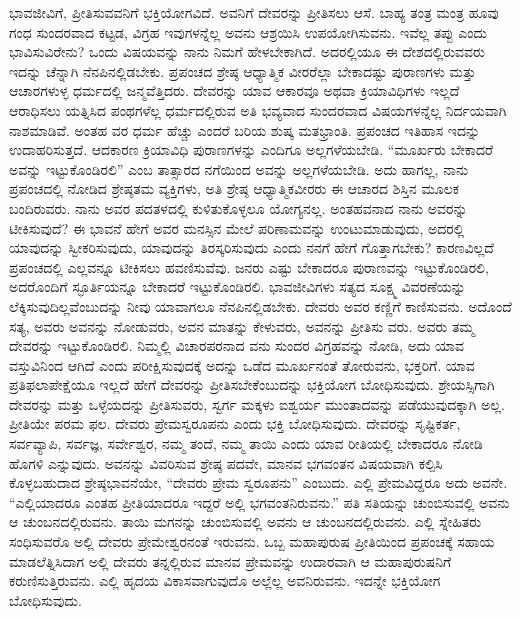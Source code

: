 ಭಾವಜೀವಿಗೆ, ಪ್ರೀತಿಸುವವನಿಗೆ ಭಕ್ತಿಯೋಗವಿದೆ. ಅವನಿಗೆ ದೇವರನ್ನು ಪ್ರೀತಿಸಲು ಆಸೆ. ಬಾಹ್ಯ ತಂತ್ರ ಮಂತ್ರ ಹೂವು ಗಂಧ ಸುಂದರವಾದ ಕಟ್ಟಡ, ವಿಗ್ರಹ ಇವುಗಳನ್ನೆಲ್ಲ ಅವನು ಆಶ್ರಯಿಸಿ ಉಪಯೋಗಿಸುವನು. ಇವೆಲ್ಲ ತಪ್ಪು ಎಂದು ಭಾವಿಸುವಿರೇನು? ಒಂದು ವಿಷಯವನ್ನು ನಾನು ನಿಮಗೆ ಹೇಳಬೇಕಾಗಿದೆ. ಅದರಲ್ಲಿಯೂ ಈ ದೇಶದಲ್ಲಿರುವವರು ಇದನ್ನು ಚೆನ್ನಾಗಿ ನೆನಪಿನಲ್ಲಿಡಬೇಕು. ಪ್ರಪಂಚದ ಶ್ರೇಷ್ಠ ಆಧ್ಯಾತ್ಮಿಕ ವೀರರೆಲ್ಲಾ ಬೇಕಾದಷ್ಟು ಪುರಾಣಗಳು ಮತ್ತು ಆಚಾರಗಳುಳ್ಳ ಧರ್ಮದಲ್ಲಿ ಜನ್ಮವೆತ್ತಿದರು. ದೇವರನ್ನು ಯಾವ ಆಕಾರವೂ ಅಥವಾ ಕ್ರಿಯಾವಿಧಿಗಳು ಇಲ್ಲದೆ ಆರಾಧಿಸಲು ಯತ್ನಿಸಿದ ಪಂಥಗಳೆಲ್ಲ ಧರ್ಮದಲ್ಲಿರುವ ಅತಿ ಭವ್ಯವಾದ ಸುಂದರವಾದ ವಿಷಯಗಳನ್ನೆಲ್ಲ ನಿರ್ದಯವಾಗಿ ನಾಶಮಾಡಿವೆ. ಅಂತಹ ವರ ಧರ್ಮ ಹೆಚ್ಚು ಎಂದರೆ ಬರಿಯ ಶುಷ್ಕ ಮತಭ್ರಾಂತಿ. ಪ್ರಪಂಚದ ಇತಿಹಾಸ ಇದನ್ನು ಉದಾಹರಿಸುತ್ತದೆ. ಆದಕಾರಣ ಕ್ರಿಯಾವಿಧಿ ಪುರಾಣಗಳನ್ನು ಎಂದಿಗೂ ಅಲ್ಲಗಳೆಯಬೇಡಿ. “ಮೂರ್ಖರು ಬೇಕಾದರೆ ಅವನ್ನು ಇಟ್ಟುಕೊಂಡಿರಲಿ” ಎಂಬ ತಾತ್ಸಾರದ ನಗೆಯಿಂದ ಅವನ್ನು ಅಲ್ಲಗಳೆಯಬೇಡಿ. ಅದು ಹಾಗಲ್ಲ, ನಾನು ಪ್ರಪಂಚದಲ್ಲಿ ನೋಡಿದ ಶ್ರೇಷ್ಠತಮ ವ್ಯಕ್ತಿಗಳು, ಅತಿ ಶ್ರೇಷ್ಠ ಆಧ್ಯಾತ್ಮಿಕವೀರರು ಈ ಆಚಾರದ ಶಿಸ್ತಿನ ಮೂಲಕ ಬಂದಿರುವರು. ನಾನು ಅವರ ಪದತಳದಲ್ಲಿ ಕುಳಿತುಕೊಳ್ಳಲೂ ಯೋಗ್ಯನಲ್ಲ. ಅಂತಹವನಾದ ನಾನು ಅವರನ್ನು ಟೀಕಿಸುವುದೆ? ಈ ಭಾವನೆ ಹೇಗೆ ಅವರ ಮನಸ್ಸಿನ ಮೇಲೆ ಪರಿಣಾಮವನ್ನು ಉಂಟುಮಾಡುವುದು, ಅದರಲ್ಲಿ ಯಾವುದನ್ನು ಸ್ವೀಕರಿಸುವುದು, ಯಾವುದನ್ನು ತಿರಸ್ಕರಿಸುವುದು ಎಂದು ನನಗೆ ಹೇಗೆ ಗೊತ್ತಾಗಬೇಕು? ಕಾರಣವಿಲ್ಲದೆ ಪ್ರಪಂಚದಲ್ಲಿ ಎಲ್ಲವನ್ನೂ ಟೀಕಿಸಲು ಹವಣಿಸುವೆವು. ಜನರು ಎಷ್ಟು ಬೇಕಾದರೂ ಪುರಾಣವನ್ನು ಇಟ್ಟುಕೊಂಡಿರಲಿ, ಅದರೊಂದಿಗೆ ಸ್ಫೂರ್ತಿಯನ್ನೂ ಬೇಕಾದರೆ ಇಟ್ಟುಕೊಂಡಿರಲಿ. ಭಾವಜೀವಿಗಳು ಸತ್ಯದ ಸೂಕ್ಷ್ಮ ವಿವರಣೆಯನ್ನು ಲೆಕ್ಕಿಸುವುದಿಲ್ಲವೆಂಬುದನ್ನು ನೀವು ಯಾವಾಗಲೂ ನೆನಪಿನಲ್ಲಿಡಬೇಕು. ದೇವರು ಅವರ ಕಣ್ಣಿಗೆ ಕಾಣಿಸುವನು. ಅದೊಂದೆ ಸತ್ಯ, ಅವರು ಅವನನ್ನು ನೋಡುವರು, ಅವನ ಮಾತನ್ನು ಕೇಳುವರು, ಅವನನ್ನು ಪ್ರೀತಿಸು ವರು. ಅವರು ತಮ್ಮ ದೇವರನ್ನು ಇಟ್ಟುಕೊಂಡಿರಲಿ. ನಿಮ್ಮಲ್ಲಿ ವಿಚಾರಪರನಾದ ವನು ಸುಂದರ ವಿಗ್ರಹವನ್ನು ನೋಡಿ, ಅದು ಯಾವ ವಸ್ತುವಿನಿಂದ ಆಗಿದೆ ಎಂದು ಪರೀಕ್ಷಿಸುವುದಕ್ಕೆ ಅದನ್ನು ಒಡೆದ ಮೂರ್ಖನಂತೆ ತೋರುವನು, ಭಕ್ತರಿಗೆ. ಯಾವ ಪ್ರತಿಫಲಾಪೇಕ್ಷೆಯೂ ಇಲ್ಲದೆ ಹೇಗೆ ದೇವರನ್ನು ಪ್ರೀತಿಸಬೇಕೆಂಬುದನ್ನು ಭಕ್ತಿಯೋಗ ಬೋಧಿಸುವುದು. ಶ್ರೇಯಸ್ಸಿಗಾಗಿ ದೇವರನ್ನು ಮತ್ತು ಒಳ್ಳೆಯದನ್ನು ಪ್ರೀತಿಸುವರು, ಸ್ವರ್ಗ ಮಕ್ಕಳು ಐಶ್ವರ್ಯ ಮುಂತಾದವನ್ನು ಪಡೆಯುವುದಕ್ಕಾಗಿ ಅಲ್ಲ. ಪ್ರೀತಿಯೇ ಪರಮ ಫಲ. ದೇವರು ಪ್ರೇಮಸ್ವರೂಪನು ಎಂದು ಭಕ್ತಿ ಬೋಧಿಸುವುದು. ದೇವರನ್ನು ಸೃಷ್ಟಿಕರ್ತ, ಸರ್ವವ್ಯಾಪಿ, ಸರ್ವಜ್ಞ, ಸರ್ವೇಶ್ವರ, ನಮ್ಮ ತಂದೆ, ನಮ್ಮ ತಾಯಿ ಎಂದು ಯಾವ ರೀತಿಯಲ್ಲಿ ಬೇಕಾದರೂ ನೋಡಿ ಹೊಗಳಿ ಎನ್ನುವುದು. ಅವನನ್ನು ವಿವರಿಸುವ ಶ್ರೇಷ್ಠ ಪದವೇ, ಮಾನವ ಭಗವಂತನ ವಿಷಯವಾಗಿ ಕಲ್ಪಿಸಿ ಕೊಳ್ಳಬಹುದಾದ ಶ್ರೇಷ್ಠಭಾವನೆಯೇ, “ದೇವರು ಪ್ರೇಮ ಸ್ವರೂಪನು” ಎಂಬುದು. ಎಲ್ಲಿ ಪ್ರೇಮವಿದ್ದರೂ ಅದು ಅವನೇ. “ಎಲ್ಲಿಯಾದರೂ ಎಂತಹ ಪ್ರೀತಿಯಾದರೂ ಇದ್ದರೆ ಅಲ್ಲಿ ಭಗವಂತನಿರುವನು.” ಪತಿ ಸತಿಯನ್ನು ಚುಂಬಿಸುವಲ್ಲಿ ಅವನು ಆ ಚುಂಬನದಲ್ಲಿರುವನು. ತಾಯಿ ಮಗನನ್ನು ಚುಂಬಿಸುವಲ್ಲಿ ಅವನು ಆ ಚುಂಬನದಲ್ಲಿರುವನು. ಎಲ್ಲಿ ಸ್ನೇಹಿತರು ಸಂಧಿಸುವರೊ ಅಲ್ಲಿ ದೇವರು ಪ್ರೇಮೇಶ್ವರನಂತೆ ಇರುವನು. ಒಬ್ಬ ಮಹಾಪುರುಷ ಪ್ರೀತಿಯಿಂದ ಪ್ರಪಂಚಕ್ಕೆ ಸಹಾಯ ಮಾಡಲೆತ್ನಿಸಿದಾಗ ಅಲ್ಲಿ ದೇವರು ತನ್ನಲ್ಲಿರುವ ಮಾನವ ಪ್ರೇಮವನ್ನು ಉದಾರವಾಗಿ ಆ ಮಹಾಪುರುಷನಿಗೆ ಕರುಣಿಸುತ್ತಿರುವನು. ಎಲ್ಲಿ ಹೃದಯ ವಿಕಾಸವಾಗುವುದೊ ಅಲ್ಲೆಲ್ಲ ಅವನಿರುವನು. ಇದನ್ನೇ ಭಕ್ತಿಯೋಗ ಬೋಧಿಸುವುದು.

